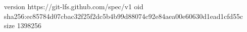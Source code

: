 version https://git-lfs.github.com/spec/v1
oid sha256:ec85784d07cbac32f25f2dc5b4b99d88074c92e84aea00e60630d1ead1cfd55c
size 1398256
